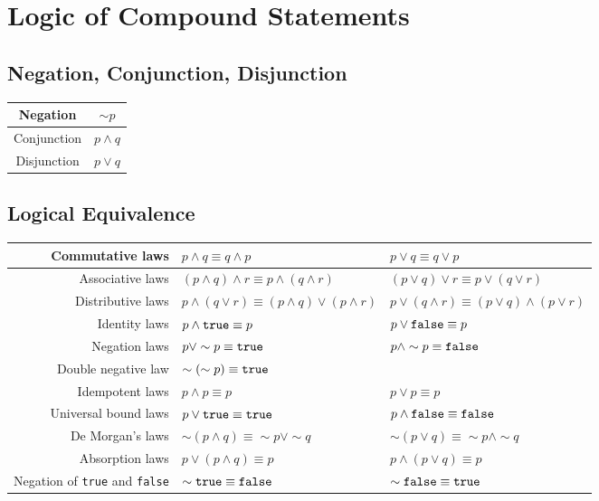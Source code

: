 \documentclass[12pt]{article}
\begin{document}
\section{Logic of Compound Statements}
\subsection{Negation, Conjunction, Disjunction}
\begin{table}[h]
\centering
\begin{tabular}{|c|c|}
\hline
Negation & $\sim p$\\\hline
Conjunction & $p\land q$\\\hline
Disjunction & $p\lor q$\\\hline
\end{tabular}
\end{table}
\subsection{Logical Equivalence}
\begin{table}[h]
\centering
\begin{tabular}{|r|l|l|}
\hline
Commutative laws & $p\land q\equiv q\land p$&$p\lor q\equiv q\lor p$\\\hline
Associative laws & $(p\land q)\land r\equiv p\land (q\land r)$ & $(p\lor q)\lor r\equiv p\lor (q\lor r)$\\\hline
Distributive laws & $p\land(q\lor r)\equiv (p\land q)\lor(p\land r)$ & $p\lor(q\land r)\equiv (p\lor q)\land(p\lor r)$\\\hline
Identity laws & $p\land \text{\texttt{true}}\equiv p$&$p\lor \text{\texttt{false}}\equiv p$\\\hline
Negation laws & $p\lor \sim p \equiv \text{\texttt{true}}$&$p\land \sim p \equiv \text{\texttt{false}}$\\\hline
Double negative law &$\sim(\sim p)\equiv \text{\texttt{true}}$&\\\hline
Idempotent laws &$p\land p \equiv p$ &$p\lor p\equiv p$\\\hline
Universal bound laws & $p\lor \text{\texttt{true}}\equiv \text{\texttt{true}}$&$p\land \text{\texttt{false}}\equiv \text{\texttt{false}}$\\\hline
De Morgan's laws&$\sim(p\land q)\equiv \sim p\lor \sim q$&$\sim(p\lor q)\equiv \sim p\land \sim q$\\\hline
Absorption laws &$p\lor (p\land q)\equiv p$&$p\land(p\lor q)\equiv p$\\\hline
Negation of \texttt{true} and \texttt{false}&$\sim\text{\texttt{true}}\equiv\text{\texttt{false}}$&$\sim\text{\texttt{false}}\equiv\text{\texttt{true}}$\\\hline
\end{tabular}
\end{table}
\end{document}
